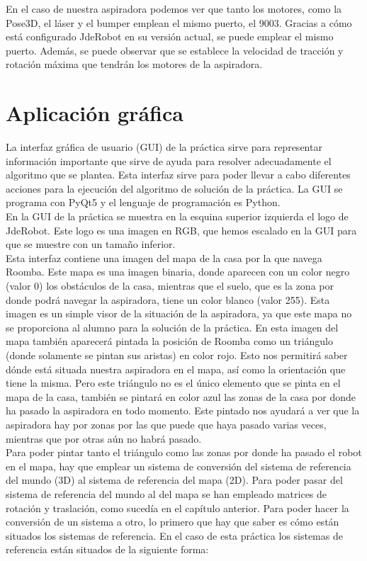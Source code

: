 	En el caso de nuestra aspiradora podemos ver que tanto los motores, como la Pose3D, el láser y el bumper emplean el mismo puerto, el 9003. Gracias a cómo está configurado JdeRobot en su versión actual, se puede emplear el mismo puerto. Además, se puede observar que se establece la velocidad de tracción y rotación máxima que tendrán los motores de la aspiradora.\\
	
\section{Aplicación gráfica}
La interfaz gráfica de usuario (GUI) de la práctica sirve para representar información importante que sirve de ayuda para resolver adecuadamente el algoritmo que se plantea. Esta interfaz sirve para poder llevar a cabo diferentes acciones para la ejecución del algoritmo de solución de la práctica. La GUI se programa con PyQt5 y el lenguaje de programación es Python.\\

En la GUI de la práctica se muestra en la esquina superior izquierda el logo de JdeRobot. Este logo es una imagen en RGB, que hemos escalado en la GUI para que se muestre con un tamaño inferior.\\

Esta interfaz contiene una imagen del mapa de la casa por la que navega Roomba. Este mapa es una imagen binaria, donde aparecen con un color negro (valor 0) los obstáculos de la casa, mientras que el suelo, que es la zona por donde podrá navegar la aspiradora, tiene un color blanco (valor 255). Esta imagen es un simple visor de la situación de la aspiradora, ya que este mapa no se proporciona al alumno para la solución de la práctica. En esta imagen del mapa también aparecerá pintada la posición de Roomba como un triángulo (donde solamente se pintan sus aristas) en color rojo. Esto nos permitirá saber dónde está situada nuestra aspiradora en el mapa, así como la orientación que tiene la misma. Pero este triángulo no es el único elemento que se pinta en el mapa de la casa, también se pintará en color azul las zonas de la casa por donde ha pasado la aspiradora en todo momento. Este pintado nos ayudará a ver que la aspiradora hay por zonas por las que puede que haya pasado varias veces, mientras que por otras aún no habrá pasado.\\

Para poder pintar tanto el triángulo como las zonas por donde ha pasado el robot en el mapa, hay que emplear un sistema de conversión del sistema de referencia del mundo (3D) al sistema de referencia del mapa (2D). Para poder pasar del sistema de referencia del mundo al del mapa se han empleado matrices de rotación y traslación, como sucedía en el capítulo anterior. Para poder hacer la conversión de un sistema a otro, lo primero que hay que saber es cómo están situados los sistemas de referencia. En el caso de esta práctica los sistemas de referencia están situados de la siguiente forma:\\

